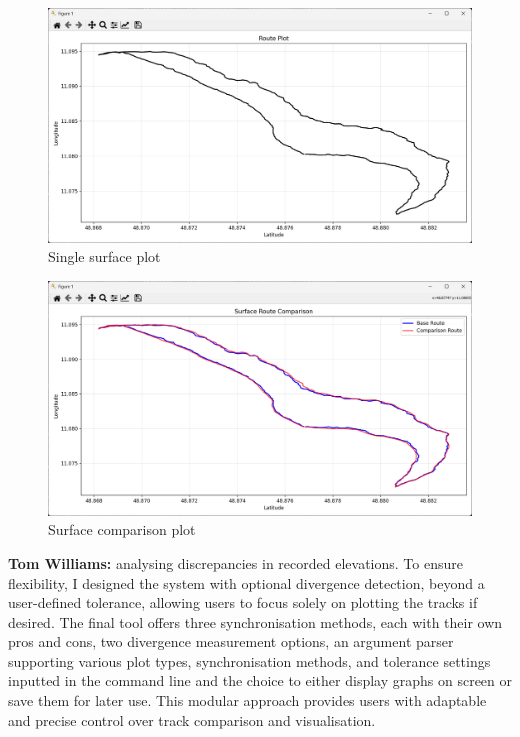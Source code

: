 \documentclass[12pt]{article}
\begin{document}
\begin{figure}[h!]
    \centering
    \includegraphics[width=\textwidth]{Project_Screenshots/7SingleSurfacePlot.png}
    \caption{Single surface plot}
\end{figure}

\begin{figure}[h!]
    \centering
    \includegraphics[width=\textwidth]{Project_Screenshots/6SurfacePlotComparisonPlot.png}
    \caption{Surface comparison plot}
\end{figure}

\clearpage

 \noindent\textbf{Tom Williams:} analysing discrepancies in recorded elevations. To ensure flexibility, I designed the system with optional divergence detection, beyond a user-defined tolerance, allowing users to focus solely on plotting the tracks if desired. The final tool offers three synchronisation methods, each with their own pros and cons, two divergence measurement options, an argument parser supporting various plot types, synchronisation methods, and tolerance settings inputted in the command line and the choice to either display graphs on screen or save them for later use. This modular approach provides users with adaptable and precise control over track comparison and visualisation.
\end{document}

